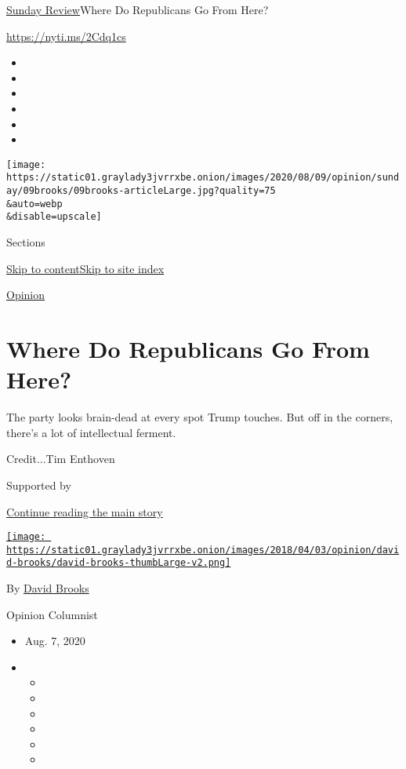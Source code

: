 \href{/section/opinion/sunday}{Sunday Review}\textbar{}Where Do
Republicans Go From Here?

\href{https://nyti.ms/2Cdq1cs}{https://nyti.ms/2Cdq1cs}

\begin{itemize}
\item
\item
\item
\item
\item
\item
\end{itemize}

\texttt{[image: https://static01.graylady3jvrrxbe.onion/images/2020/08/09/opinion/sunday/09brooks/09brooks-articleLarge.jpg?quality=75\\\&auto=webp\\\&disable=upscale]}

Sections

\protect\hyperlink{site-content}{Skip to
content}\protect\hyperlink{site-index}{Skip to site index}

\href{/section/opinion}{Opinion}

\hypertarget{where-do-republicans-go-from-here}{%
\section{Where Do Republicans Go From
Here?}\label{where-do-republicans-go-from-here}}

The party looks brain-dead at every spot Trump touches. But off in the
corners, there's a lot of intellectual ferment.

Credit...Tim Enthoven

Supported by

\protect\hyperlink{after-sponsor}{Continue reading the main story}

\href{https://www.nytimes3xbfgragh.onion/by/david-brooks}{\texttt{[image: https://static01.graylady3jvrrxbe.onion/images/2018/04/03/opinion/david-brooks/david-brooks-thumbLarge-v2.png]}}

By \href{https://www.nytimes3xbfgragh.onion/by/david-brooks}{David
Brooks}

Opinion Columnist

\begin{itemize}
\item
  Aug. 7, 2020
\item
  \begin{itemize}
  \item
  \item
  \item
  \item
  \item
  \item
  \end{itemize}
\end{itemize}


